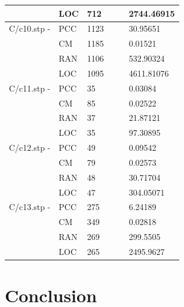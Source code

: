 \documentclass[12pt,a4paper]{article}
\begin{document}
\begin{center}
\begin{tabular}{l|l|l|l|l|l}
		&LOC&712&&&2744.46915\\\hline
		C/c10.stp - &PCC&1123&&&30.95651\\
		&CM&1185&&&0.01521\\
		&RAN&1106&&&532.90324\\
		&LOC&1095&&&4611.81076\\\hline
		C/c11.stp - &PCC&35&&&0.03084\\
		&CM&85&&&0.02522\\
		&RAN&37&&&21.87121\\
		&LOC&35&&&97.30895\\\hline
		C/c12.stp - &PCC&49&&&0.09542\\
		&CM&79&&&0.02573\\
		&RAN&48&&&30.71704\\
		&LOC&47&&&304.05071\\\hline
		C/c13.stp - &PCC&275&&&6.24189\\
		&CM&349&&&0.02818\\
		&RAN&269&&&299.5505\\
		&LOC&265&&&2495.9627\\\hline
	\end{tabular}
\end{center}

\section{Conclusion}
\end{document}
